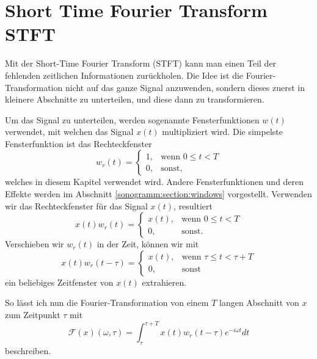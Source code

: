 %
%
%
%
\section{Short Time Fourier Transform STFT\label{sonogramm:section:teil0}}
Mit der Short-Time Fourier Transform (STFT) kann man einen Teil der fehlenden zeitlichen Informationen zurückholen.
%
%
Die Idee ist die Fourier-Transformation nicht auf das ganze Signal anzuwenden, sondern dieses zuerst in kleinere
Abschnitte zu unterteilen, und diese dann zu transformieren.

Um das Signal zu unterteilen, werden sogenannte Fensterfunktionen $w(t)$ verwendet, mit welchen das Signal
%
$x(t)$ multipliziert wird.
Die simpelste Fensterfunktion ist das Rechteckfenster
%
\begin{equation}
    w_r(t) = 
        \begin{cases}
        1,& \text{wenn } 0 \le t < T\\
        0, & \text{sonst, }
        \end{cases}
\end{equation}
welches in diesem Kapitel verwendet wird.
Andere Fensterfunktionen und deren Effekte werden im Abschnitt \ref{sonogramm:section:windows} vorgestellt.
Verwenden wir das Rechteckfenster für das Signal $x(t)$, resultiert 
\begin{equation}
    x(t) w_r(t) = 
    \begin{cases}
    x(t),& \text{wenn } 0 \le t < T\\
    0, & \text{sonst.}
    \end{cases}
\end{equation}
Verschieben wir $w_r(t)$ in der Zeit, können wir mit 
\begin{equation}
    x(t) w_r(t-\tau) = 
    \begin{cases}
        x(t),& \text{wenn } \tau \le t < \tau + T\\
        0, & \text{sonst}
    \end{cases}
\end{equation}
ein beliebiges Zeitfenster von $x(t)$ extrahieren.

So lässt ich nun die Fourier-Transformation von einem $T$ langen Abschnitt
von $x$ zum Zeitpunkt $\tau$ mit
\begin{equation}
    \mathscr{F}(x)(\omega, \tau) = \int_{\tau}^{\tau+T} x(t) w_r(t - \tau) e^{-i \omega t} dt
\end{equation}
beschreiben.

